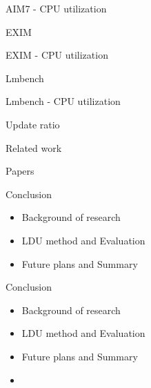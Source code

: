\documentclass[english]{beamer} %
\begin{document}
\begin{frame}{AIM7 - CPU utilization}
\end{frame}

\begin{frame}{EXIM}
\end{frame}


\begin{frame}{EXIM - CPU utilization}
\end{frame}


\begin{frame}{Lmbench}
\end{frame}


\begin{frame}{Lmbench - CPU utilization}
\end{frame}



\begin{frame}{Update ratio}
\end{frame}


\begin{frame}{Related work}

\end{frame}


\begin{frame}{Papers}

\end{frame}


\begin{frame}{Conclusion}
	\begin{itemize}
	\item Background of research 
	\item LDU method and Evaluation
	\item Future plans and Summary
	\end{itemize}
\end{frame}


\begin{frame}{Conclusion}
    \begin{itemize}
    \item Background of research 
    \item LDU method and Evaluation
    \item Future plans and Summary
    \item {}
    \end{itemize}
\end{frame}
\end{document}
